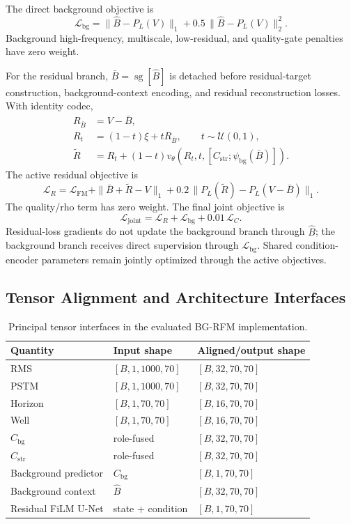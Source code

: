 \documentclass[11pt]{article}
\begin{document}
The direct background objective is
\begin{equation}
\mathcal L_{\mathrm{bg}}
=
\|\hat B-P_L(V)\|_1
+0.5\,\|\hat B-P_L(V)\|_2^2.
\end{equation}
Background high-frequency, multiscale, low-residual, and quality-gate penalties have zero weight.

For the residual branch, $\bar B=\operatorname{sg}[\hat B]$ is detached before residual-target construction, background-context encoding, and residual reconstruction losses. With identity codec,
\begin{align}
R_{\bar B}&=V-\bar B,\\
R_t&=(1-t)\xi+tR_{\bar B},\qquad t\sim\mathcal U(0,1),\\
\widetilde R&=R_t+(1-t)v_\theta(R_t,t,[C_{\mathrm{str}};\psi_{\mathrm{bg}}(\bar B)]).
\end{align}
The active residual objective is
\begin{equation}
\mathcal L_R
=
\mathcal L_{\mathrm{FM}}
+\|\bar B+\widetilde R-V\|_1
+0.2\,\|P_L(\widetilde R)-P_L(V-\bar B)\|_1 .
\end{equation}
The quality/rho term has zero weight. The final joint objective is
\begin{equation}
\mathcal L_{\mathrm{joint}}
=
\mathcal L_R+\mathcal L_{\mathrm{bg}}+0.01\,\mathcal L_C.
\end{equation}
Residual-loss gradients do not update the background branch through $\hat B$; the background branch receives direct supervision through $\mathcal L_{\mathrm{bg}}$. Shared condition-encoder parameters remain jointly optimized through the active objectives.

\subsection{Tensor Alignment and Architecture Interfaces}

\begin{table}[t]
\centering
\caption{Principal tensor interfaces in the evaluated BG-RFM implementation.}
\begin{tabular}{lll}
\toprule
Quantity & Input shape & Aligned/output shape \\
\midrule
RMS & $[B,1,1000,70]$ & $[B,32,70,70]$ \\
PSTM & $[B,1,1000,70]$ & $[B,32,70,70]$ \\
Horizon & $[B,1,70,70]$ & $[B,16,70,70]$ \\
Well & $[B,1,70,70]$ & $[B,16,70,70]$ \\
$C_{\mathrm{bg}}$ & role-fused & $[B,32,70,70]$ \\
$C_{\mathrm{str}}$ & role-fused & $[B,32,70,70]$ \\
Background predictor & $C_{\mathrm{bg}}$ & $[B,1,70,70]$ \\
Background context & $\hat B$ & $[B,32,70,70]$ \\
Residual FiLM U-Net & state + condition & $[B,1,70,70]$ \\
\bottomrule
\end{tabular}
\end{table}
\end{document}

